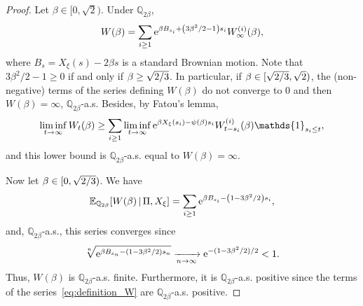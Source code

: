 \documentclass[10pt]{amsart}
\theoremstyle{definition}\newtheorem{defi}[theo]{Definition}\newtheorem{rema}[theo]{Remark}\newtheorem{exam}[theo]{Example}\newtheorem{exem}[theo]{Example}\newtheorem{nota}[theo]{Notation}
\newcommand{\e}{\mathrm{e}}
\newcommand{\E}{\mathbb{E}}
\newcommand{\Q}{\mathbb{Q}}
\newcommand\1{\mathds{1}}
\let\originalleft\left
\let\originalright\right
\renewcommand{\left}{\mathopen{}\mathclose\bgroup\originalleft}
\renewcommand{\right}{\aftergroup\egroup\originalright}
\renewcommand*{\to}{\mathchoice{\longrightarrow}{\rightarrow}{\rightarrow}{\rightarrow}}
\begin{document}
\begin{proof}
Let $\beta \in [0,\sqrt{2})$. Under $\Q_{2\beta}$,
\begin{equation*}
W(\beta) = \sum_{i \geq 1} \e^{\beta B_{s_i} + \left(3\beta^2/2 - 1\right) s_i} W_\infty^{(i)}(\beta),
\end{equation*}
where $B_s = X_\xi(s) - 2 \beta s$ is a standard Brownian motion. Note that $3\beta^2/2 - 1 \geq 0$ if and only if $\beta \geq \sqrt{2\smash{/}3}$. In particular, if $\beta \in [\sqrt{2\smash{/}3}, \sqrt{2})$, the (non-negative) terms of the series defining $W(\beta)$ do not converge to $0$ and then $W(\beta) = \infty$, $\Q_{2\beta}$-a.s. Besides, by Fatou's lemma,
\begin{equation*}
\liminf_{t \to \infty} W_t(\beta) \geq \sum_{i \geq 1} \liminf_{t \to \infty} \e^{\beta X_\xi(s_i) - \psi(\beta)s_i} W_{t - s_i}^{(i)}(\beta) \1_{s_i \leq t},
\end{equation*}
and this lower bound is $\Q_{2\beta}$-a.s. equal to $W(\beta) = \infty$.

Now let $\beta \in [0, \sqrt{2\smash{/}3})$. We have
\begin{equation}\label{eq:W(beta)_finite}
\E_{\Q_{2\beta}} \left[W(\beta) \,\middle|\, \Pi, X_\xi \right] = \sum_{i \geq 1} \e^{\beta B_{s_i} - \left(1 - 3\beta^2/2\right) s_i},
\end{equation}
and, $\Q_{2\beta}$-a.s., this series converges since
\begin{equation*}
\sqrt[n]{\e^{\beta B_{s_n} - (1 - 3\beta^2/2) s_n}} \xrightarrow[n \to \infty]{} \e^{-(1 - 3\beta^2/2)/2} < 1.
\end{equation*}
Thus, $W(\beta)$ is $\Q_{2\beta}$-a.s. finite. Furthermore, it is $\Q_{2\beta}$-a.s. positive since the terms of the series~\eqref{eq:definition_W} are $\Q_{2\beta}$-a.s. positive.


\end{proof}
\end{document}

